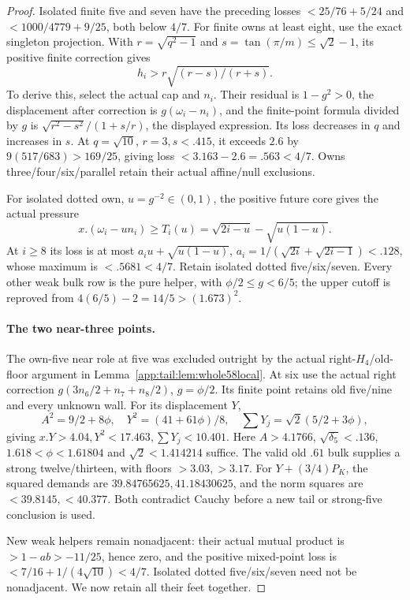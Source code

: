 \begin{proof}
Isolated finite five and seven have the preceding losses
$<25/76+5/24$ and $<1000/4779+9/25$, both below $4/7$.
For finite owns at least eight, use the exact singleton projection.
With $r=\sqrt{q^2-1}$ and $s=\tan(\pi/m)\le\sqrt2-1$, its
positive finite correction gives
\[
 h_i>r\sqrt{(r-s)/(r+s)}.
\]
To derive this, select the actual cap and $n_i$. Their residual is
$1-g^2>0$, the displacement after correction is $g(\omega_i-n_i)$,
and the finite-point formula divided by $g$ is
$\sqrt{r^2-s^2}/(1+s/r)$, the displayed expression.
Its loss decreases in $q$ and increases in $s$. At $q=\sqrt{10}$,
$r=3,s<.415$, it exceeds $2.6$ by
$9(517/683)>169/25$, giving loss $<3.163-2.6=.563<4/7$.
Owns three/four/six/parallel retain their actual affine/null exclusions.

For isolated dotted own, $u=g^{-2}\in(0,1)$, the positive future
core gives the actual pressure
\[
 x.(\omega_i-u n_i)\ge T_i(u)
 =\sqrt{2i-u}-\sqrt{u(1-u)}.
\]
At $i\ge8$ its loss is at most
$a_i u+\sqrt{u(1-u)}$, $a_i=1/(\sqrt{2i}+\sqrt{2i-1})<.128$,
whose maximum is $<.5681<4/7$. Retain isolated dotted five/six/seven.
Every other weak bulk row is the pure helper, with
$\phi/2\le g<6/5$; the upper cutoff is reproved from
$4(6/5)-2=14/5>(1.673)^2$.

\paragraph{The two near-three points.}
The own-five near role at five was excluded outright by the actual
right-$H_4$/old-floor argument in
Lemma~\ref{app:tail:lem:whole58local}. At six use the actual
right correction $g(3n_6/2+n_7+n_8/2)$, $g=\phi/2$.
Its finite point retains old five/nine and every unknown wall.
For its displacement $Y$,
\[
 A^2=9/2+8\phi,\quad Y^2=(41+61\phi)/8,\quad
 \sum Y_j=\sqrt2(5/2+3\phi),
\]
giving $x.Y>4.04,Y^2<17.463,\sum Y_j<10.401$.
Here $A>4.1766$, $\sqrt{\delta_5}<.136$,
$1.618<\phi<1.61804$ and $\sqrt2<1.414214$ suffice.
The valid old $.61$ bulk supplies a strong twelve/thirteen, with
floors $>3.03,>3.17$. For $Y+(3/4)P_K$, the squared demands are
$39.84765625,41.18430625$, and the norm squares are
$<39.8145,<40.377$. Both contradict Cauchy before a new tail or
strong-five conclusion is used.

New weak helpers remain nonadjacent: their actual mutual product
is $>1-ab>-11/25$, hence zero, and the positive mixed-point loss
is $<7/16+1/(4\sqrt{10})<4/7$. Isolated dotted five/six/seven
need not be nonadjacent. We now retain all their feet together.


\end{proof}
